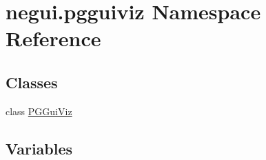 \hypertarget{namespacenegui_1_1pgguiviz}{}\section{negui.\+pgguiviz Namespace Reference}
\label{namespacenegui_1_1pgguiviz}
\subsection*{Classes}
\begin{DoxyCompactItemize}
\item 
class \hyperlink{classnegui_1_1pgguiviz_1_1PGGuiViz}{P\+G\+Gui\+Viz}
\end{DoxyCompactItemize}
\subsection*{Variables}
